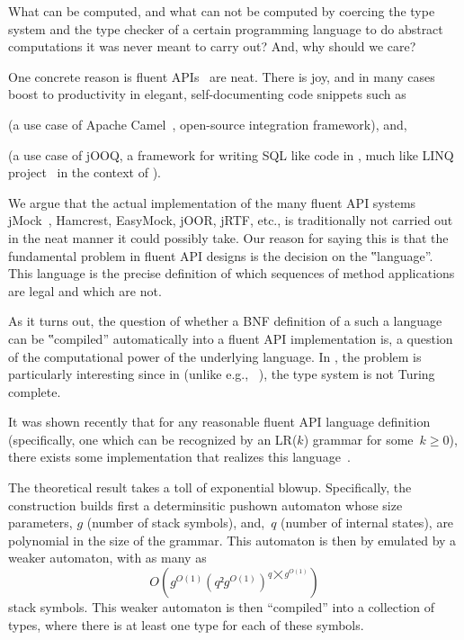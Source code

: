 What can be computed, and what can not be computed by coercing the type system
and the type checker of a certain programming language to do abstract
computations it was never meant to carry out? And, why should we care?

One concrete reason is fluent
APIs~\cite{VanDeursen:Klint:2000,Hudak:1997,Fowler:2010} are neat.
There is joy, and in many cases boost to productivity
in elegant, self-documenting code snippets such as
\begin{quote}
  \label{figure:DSL}
  \parbox[c]{44ex}{}
\end{quote}
(a use case of Apache Camel~\cite{Ibsen:Anstey:10}, open-source integration
framework), and,
\begin{quote}
\end{quote}
(a use case of jOOQ, a framework for writing
SQL like code in \Java, much like LINQ project~\cite{Meijer:Beckman:Bierman:06}
in the context of \CSharp).

We argue that
the actual implementation of the many fluent API systems
jMock~\cite{Freeman:Pryce:06},
Hamcrest,
EasyMock,
jOOR,
jRTF,
etc., is traditionally not carried out
in the neat manner it could possibly take.
Our reason for saying this is that the fundamental problem in
fluent API designs is the decision on the ‟language”.
This language is the precise definition of which sequences of method
applications are legal and which are not.

As it turns out, the question of whether a BNF definition of a such a language
can be ‟compiled” automatically into a fluent API implementation is, a
question of the computational power of the underlying language. In \Java, the problem
is particularly interesting since in \Java (unlike e.g., \CC~\cite{Gutterman:2003}),
the type system is not Turing complete.

It was shown recently that for any reasonable fluent API language definition
(specifically, one which can be recognized by an LR($k$) grammar for some~$k
≥0$), there exists some \Java implementation that realizes this
language~\cite{Gil:Levy:2016}.

The theoretical result takes a toll of exponential blowup. Specifically, the
construction builds first a determinsitic pushown automaton whose size
parameters, $g$ (number of stack symbols), and,~$q$ (number of internal
states), are polynomial in the size of the grammar. This automaton is then
by emulated by a weaker automaton, with as many as
\[
  O\left(g^{O(1)}(q²g^{O(1)})^{q⨉g^{O(1)}}\right)
\] 
stack symbols.
This weaker automaton is then ``compiled'' into a  collection of \Java types,
where there is at least one type for each of these symbols.

